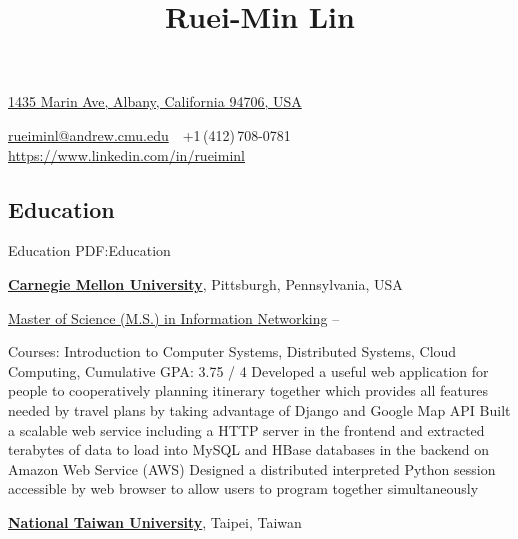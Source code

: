 \documentclass[a4paper,10pt,oneside]{article}
\begin{document}

\title{Ruei-Min Lin}

\begin{subtitle}
\href{https://www.google.com/maps/place/1435+Marin+Ave,+Albany,+CA+94706}
{1435 Marin Ave, Albany, California 94706, USA}
\par
\href{mailto:rueiminl@andrew.cmu.edu}
{rueiminl@andrew.cmu.edu}
\,\BulletSymbol\,
+1\,(412)\,708-0781
\,\BulletSymbol\,
\href{https://www.linkedin.com/in/rueiminl}
{https://www.linkedin.com/in/rueiminl}
\end{subtitle}

\begin{body}


\section{Education}
{Education}
{PDF:Education}

\href{http://www.cmu.edu/}
{\textbf{Carnegie Mellon University}},
Pittsburgh, Pennsylvania, USA


\SmallEntryGap
\href{http://www.ini.cmu.edu/degrees/msin/index.html}
{Master of Science (M.S.) in Information Networking}
\hfill
{} --

\begin{detail}

\BulletItem
Courses: Introduction to Computer Systems, Distributed Systems, Cloud Computing,
\newline
\hspace*{4 em}{Packet Switching and Computer Networking, Web Application Development}
\BulletItem
Cumulative GPA: 3.75 / 4
\BulletItem
Developed a useful web application for people to cooperatively planning itinerary together which provides all features needed by travel plans by taking advantage of Django and Google Map API
\BulletItem
Built a scalable web service including a HTTP server in the frontend and extracted terabytes of data to load into MySQL and HBase databases in the backend on Amazon Web Service (AWS)
\BulletItem
Designed a distributed interpreted Python session accessible by web browser to allow users to program together simultaneously
\end{detail}


\EntryGap

\href{http://www.ntu.edu.tw/english/index.html}
{\textbf{National Taiwan University}},
Taipei, Taiwan


\end{body}
\end{document}
